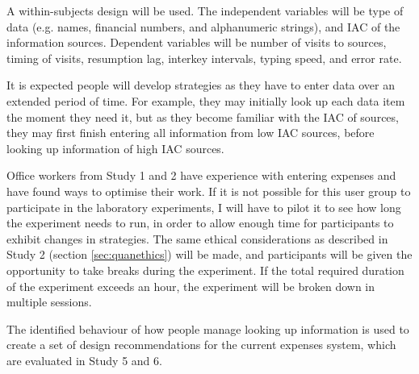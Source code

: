 \begin{table}
A within-subjects design will be used. The independent variables will be type of data (e.g. names, financial numbers, and alphanumeric strings), and IAC of the information sources. Dependent variables will be number of visits to sources, timing of visits, resumption lag, interkey intervals, typing speed, and error rate.

It is expected people will develop strategies as they have to enter data over an extended period of time. 
For example, they may initially look up each data item the moment they need it, but as they become familiar with the IAC of sources, they may first finish entering all information from low IAC sources, before looking up information of high IAC sources. 

Office workers from Study 1 and 2 have experience with entering expenses and have found ways to optimise their work. If it is not possible for this user group to participate in the laboratory experiments, I will have to pilot it to see how long the experiment needs to run, in order to allow enough time for participants to exhibit changes in strategies. The same ethical considerations as described in Study 2 (section \ref{sec:quanethics}) will be made, and participants will be given the opportunity to take breaks during the experiment. If the total required duration of the experiment exceeds an hour, the experiment will be broken down in multiple sessions.

The identified behaviour of how people manage looking up information is used to create a set of design recommendations for the current expenses system, which are evaluated in Study 5 and 6.


\end{table}
